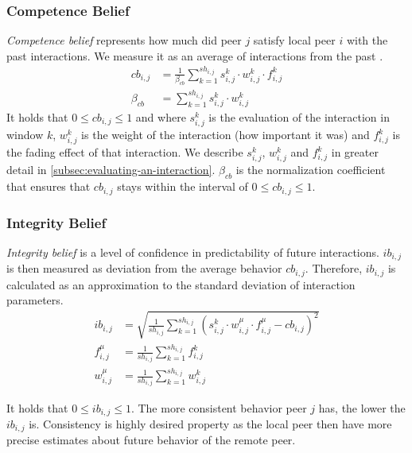 \subsubsection{Competence Belief}
\textit{Competence belief} represents how much did peer $j$ satisfy local peer $i$ with the past interactions. We measure it as an average of interactions from the past \cite{sort}.
\begin{equation}
\begin{split}
    cb_{i,j} &= \frac{1}{\beta_{cb}} \sum_{k=1}^{sh_{i, j}} s_{i,j}^{k} \cdot w_{i,j}^{k} \cdot f_{i,j}^{k} \\
    \beta_{cb} &= \sum_{k=1}^{sh_{i, j}} s_{i,j}^{k} \cdot w_{i,j}^{k}
\end{split}
\end{equation}
It holds that $0 \leq cb_{i,j} \leq 1$ and where $s^{k}_{i,j}$ is the evaluation of the interaction in window $k$, $w^{k}_{i, j}$ is the weight of the interaction (how important it was) and $f^{k}_{i,j}$ is the fading effect of that interaction. We describe $s^{k}_{i,j}$, $w^{k}_{i,j}$ and $f^{k}_{i,j}$ in greater detail in \ref{subsec:evaluating-an-interaction}. 
$\beta_{cb}$ is the normalization coefficient that ensures that $cb_{i, j}$ stays within the interval of $0 \leq cb_{i,j} \leq 1$.

\subsubsection{Integrity Belief}
\textit{Integrity belief} is a level of confidence in predictability of future interactions. $ib_{i,j}$ is then measured as deviation from the average behavior $cb_{i,j}$. 
Therefore, $ib_{i,j}$ is calculated as an approximation to the standard deviation of interaction parameters\cite{sort}.
\begin{equation}
\begin{split}
    ib_{i,j} &= \sqrt{\frac{1}{sh_{i,j}} \sum_{k=1}^{sh_{i,j}}\left(s_{i,j}^{k} \cdot w_{i,j}^{\mu} \cdot f_{i,j}^{\mu} - cb_{i,j}\right)^{2}} \\
    f_{i,j}^{\mu} &= \frac{1}{sh_{i, j}} \sum_{k=1}^{sh_{i,j}} f^{k}_{i,j} \\
    w_{i,j}^{\mu} &= \frac{1}{sh_{i, j}} \sum_{k=1}^{sh_{i,j}} w^{k}_{i,j}
\end{split}
\end{equation}

It holds that $0 \leq ib_{i,j} \leq 1$.
The more consistent behavior peer $j$ has, the lower the $ib_{i,j}$ is. Consistency is highly desired property as the local peer then have more precise estimates about future behavior of the remote peer.

